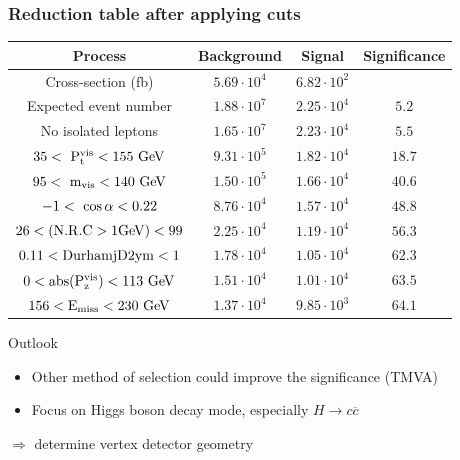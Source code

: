 \documentclass{beamer}
\begin{document}
\begin{frame}
    \frametitle{Reduction table after applying cuts}

    \hspace{-0.7cm}
    \centering 
    \footnotesize{ 
                \begin{tabular}{c c c c}
      \hline
      Process                                     & Background          & Signal              & Significance  \tabularnewline
      \hline
      \hline
      Cross-section (fb)                          & $5.69 \cdot 10^{4}$ & $6.82 \cdot 10^{2}$ &               \tabularnewline
      \hline
      Expected event number                       & $1.88 \cdot 10^{7}$ & $2.25 \cdot 10^{4}$ & $5.2$         \tabularnewline
      No isolated leptons                         & $1.65 \cdot 10^{7}$ & $2.23 \cdot 10^{4}$ & $5.5$         \tabularnewline
      {$35 <~\rm{{P}_{t}^{vis}} < 155~\rm{GeV} $} & $9.31 \cdot 10^{5}$ & $1.82 \cdot 10^{4}$ & $18.7$        \tabularnewline
      {$95 <~\rm{m_{vis}}< 140~\rm{GeV}$}         & $1.50 \cdot 10^{5}$ & $1.66 \cdot 10^{4}$ & $40.6$        \tabularnewline
      {$-1 <~\rm{\cos{\alpha}}< 0.22$}            & $8.76 \cdot 10^{4}$ & $1.57 \cdot 10^{4}$ & $48.8$        \tabularnewline
      $26 < (\rm{N.R.C > 1GeV}) < 99$             & $2.25 \cdot 10^{4}$ & $1.19 \cdot 10^{4}$ & $56.3$        \tabularnewline
      $0.11 < \rm{DurhamjD2ym} < 1$               & $1.78 \cdot 10^{4}$ & $1.05 \cdot 10^{4}$ & $62.3$        \tabularnewline
      $0 < \rm{abs(P_{z}^{vis})} < 113~\rm{GeV}$& $1.51 \cdot 10^{4}$ & $1.01 \cdot 10^{4}$ & $63.5$        \tabularnewline
      $156 < \rm{E_{miss}} < 230~\rm{GeV}$   & $1.37 \cdot 10^{4}$ & $9.85 \cdot 10^{3}$ & $64.1$        \tabularnewline      
      \hline %
    \end{tabular}
   }
   \begin{block}{Outlook}
     \begin{itemize}
       \item Other method of selection could improve the significance (TMVA)
       \item Focus on Higgs boson decay mode, especially $H \rightarrow c \overline{c}$ 
     \end{itemize}
     \centering
     $\Rightarrow$ determine vertex detector geometry  
   \end{block}
\end{frame}

\end{document}
